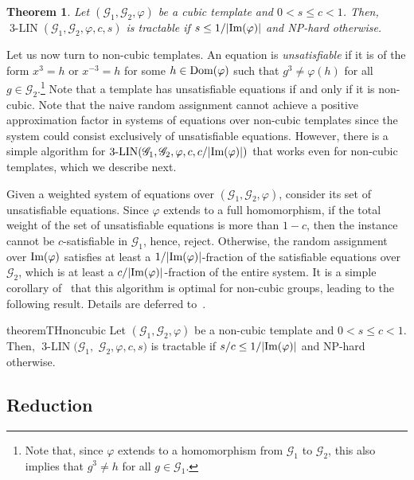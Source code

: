 \documentclass[a4paper,11pt]{article}
\newtheorem{theorem}{Theorem}[section]
\theoremstyle{definition}
\newcommand{\gr}{\mathscr{G}}
\newcommand{\im}{\textnormal{Im}}
\newcommand{\dom}{\textnormal{Dom}}
\newcommand{\eq}{\ensuremath{\operatorname{3-LIN}}}
\begin{document}
\begin{theorem}
\label{th:main-cubic}
    Let $(\gr_1, \gr_2, \varphi)$ be a cubic template 
    and $0<s\leq c<1$. Then, $\eq(\gr_1, \gr_2, \varphi, c, s)$ is tractable if $s \leq 1/|\im(\varphi)|$ and NP-hard otherwise.
\end{theorem}


Let us now turn to non-cubic templates. 
An equation is \emph{unsatisfiable} if it is
of the form $x^3=h$ or $x^{-3}=h$ for some $h\in \dom(\varphi)$ such that $g^3 \neq \varphi(h)$ for all $g \in \gr_2$.\footnote{Note
that, since $\varphi$ extends to a homomorphism from $\gr_1$ to $\gr_2$, this also implies
that $g^3 \neq h$ for all $g \in \gr_1$.}
Note that a
template has unsatisfiable equations if and only if it is non-cubic. Note that
the naive random assignment cannot achieve a positive approximation factor in
systems of equations over non-cubic templates since 
the system could consist exclusively of unsatisfiable equations. However, there is a simple
algorithm for $\eq(\gr_1,\gr_2,\varphi,c,c/|\im(\varphi)|)$ that works even for
non-cubic templates, which we describe next.

Given a weighted
system of equations over $(\gr_1,\gr_2,\varphi)$, consider its set of unsatisfiable equations. 
Since $\varphi$ extends to a full homomorphism, if the total weight of the set of unsatisfiable equations is more than $1-c$, then the instance cannot be $c$-satisfiable in $\gr_1$, hence, reject.
Otherwise, the random assignment over $\im(\varphi)$ satisfies at least a
$1/|\im(\varphi)|$-fraction of the satisfiable equations over $\gr_2$, which is at least a $c/|\im(\varphi)|$-fraction of the entire system. 
It is a simple corollary of~ that this algorithm is optimal for non-cubic groups, leading to the following result. Details are deferred to~.

\begin{restatable}{theorem}{THnoncubic}
\label{th:main-non-cubic}
    Let $(\gr_1, \gr_2, \varphi)$ be a non-cubic template 
    and $0<s\leq c<1$. Then, $\eq(\gr_1,$ $ \gr_2, \varphi, c, s)$ is tractable if $s/c \leq 1/|\im(\varphi)|$ and NP-hard otherwise.
\end{restatable}




\subsection{Reduction} \label{sec:reduction}
\end{document}
